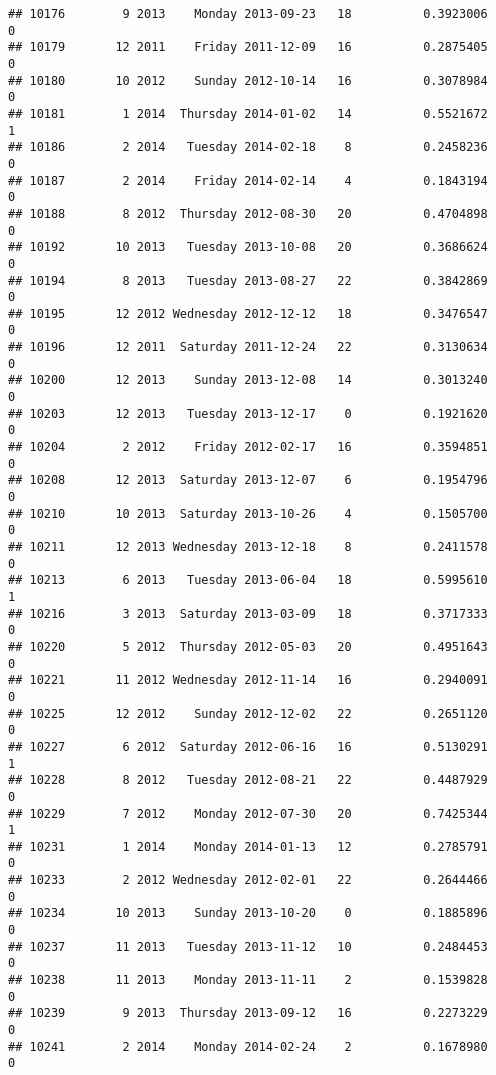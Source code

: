 \documentclass[
]{article}
\begin{document}
\begin{verbatim}
## 10176        9 2013    Monday 2013-09-23   18          0.3923006             0
## 10179       12 2011    Friday 2011-12-09   16          0.2875405             0
## 10180       10 2012    Sunday 2012-10-14   16          0.3078984             0
## 10181        1 2014  Thursday 2014-01-02   14          0.5521672             1
## 10186        2 2014   Tuesday 2014-02-18    8          0.2458236             0
## 10187        2 2014    Friday 2014-02-14    4          0.1843194             0
## 10188        8 2012  Thursday 2012-08-30   20          0.4704898             0
## 10192       10 2013   Tuesday 2013-10-08   20          0.3686624             0
## 10194        8 2013   Tuesday 2013-08-27   22          0.3842869             0
## 10195       12 2012 Wednesday 2012-12-12   18          0.3476547             0
## 10196       12 2011  Saturday 2011-12-24   22          0.3130634             0
## 10200       12 2013    Sunday 2013-12-08   14          0.3013240             0
## 10203       12 2013   Tuesday 2013-12-17    0          0.1921620             0
## 10204        2 2012    Friday 2012-02-17   16          0.3594851             0
## 10208       12 2013  Saturday 2013-12-07    6          0.1954796             0
## 10210       10 2013  Saturday 2013-10-26    4          0.1505700             0
## 10211       12 2013 Wednesday 2013-12-18    8          0.2411578             0
## 10213        6 2013   Tuesday 2013-06-04   18          0.5995610             1
## 10216        3 2013  Saturday 2013-03-09   18          0.3717333             0
## 10220        5 2012  Thursday 2012-05-03   20          0.4951643             0
## 10221       11 2012 Wednesday 2012-11-14   16          0.2940091             0
## 10225       12 2012    Sunday 2012-12-02   22          0.2651120             0
## 10227        6 2012  Saturday 2012-06-16   16          0.5130291             1
## 10228        8 2012   Tuesday 2012-08-21   22          0.4487929             0
## 10229        7 2012    Monday 2012-07-30   20          0.7425344             1
## 10231        1 2014    Monday 2014-01-13   12          0.2785791             0
## 10233        2 2012 Wednesday 2012-02-01   22          0.2644466             0
## 10234       10 2013    Sunday 2013-10-20    0          0.1885896             0
## 10237       11 2013   Tuesday 2013-11-12   10          0.2484453             0
## 10238       11 2013    Monday 2013-11-11    2          0.1539828             0
## 10239        9 2013  Thursday 2013-09-12   16          0.2273229             0
## 10241        2 2014    Monday 2014-02-24    2          0.1678980             0

\end{verbatim}
\end{document}

